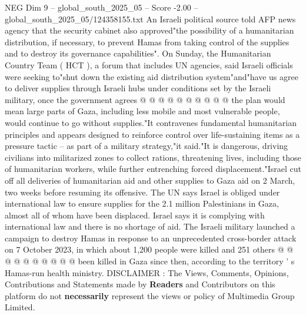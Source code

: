 \begin{textsample}{NEG Dim 9 – global\_south\_2025\_05 – Score -2.00 – global\_south\_2025\_05/124358155.txt}
An Israeli political source told AFP news agency that the security cabinet also approved"the possibility of a humanitarian distribution, if necessary, to prevent Hamas from taking control of the supplies and to destroy its governance capabilities".
On Sunday, the Humanitarian Country Team ( HCT ), a forum that includes UN agencies, said Israeli officials were seeking to"shut down the existing aid distribution system"and"have us agree to deliver supplies through Israeli hubs under conditions set by the Israeli military, once the government agrees @ @ @ @ @ @ @ @ @ @ the plan would mean large parts of Gaza, including less mobile and most vulnerable people, would continue to go without supplies."It contravenes fundamental humanitarian principles and appears designed to reinforce control over life-sustaining items as a pressure tactic -- as part of a military strategy,"it said."It is dangerous, driving civilians into militarized zones to collect rations, threatening lives, including those of humanitarian workers, while further entrenching forced displacement."Israel cut off all deliveries of humanitarian aid and other supplies to Gaza aid on 2 March, two weeks before resuming its offensive.
The UN says Israel is obliged under international law to ensure supplies for the 2.1 million Palestinians in Gaza, almost all of whom have been displaced.
Israel says it is complying with international law and there is no shortage of aid.
The Israeli military launched a campaign to destroy Hamas in response to an unprecedented cross-border attack on 7 October 2023, in which about 1,200 people were killed and 251 others @ @ @ @ @ @ @ @ @ @ been killed in Gaza since then, according to the territory ' s Hamas-run health ministry.
DISCLAIMER : The Views, Comments, Opinions, Contributions and Statements made by \textbf{Readers} and Contributors on this platform do not \textbf{necessarily} represent the views or policy of Multimedia Group Limited.

\end{textsample}
